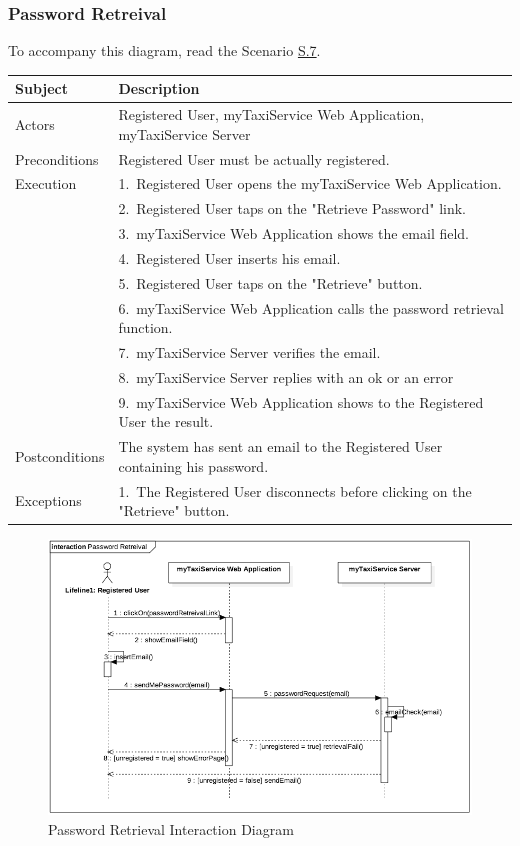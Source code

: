 \subsubsection{Password Retreival}
			To accompany this diagram, read the Scenario \hyperref[sec:PasswordRetrievalScenario]{S.7}.

				\begin{table}[htpb]
					\centering
					\label{tab:PasswordRetrievalDiagramTable}
					\begin{tabularx}{\textwidth}{lp{9cm}}
						\hline
						\hline
							\textbf{Subject}
						& 
							\textbf{Description}\\
						\hline
							Actors	       &  Registered User, myTaxiService Web Application, myTaxiService Server\\
						\hline
							Preconditions  &  Registered User must be actually registered.\\
						\hline
							Execution      &  1.~Registered User opens the myTaxiService Web Application.\\
										   &  2.~Registered User taps on the "Retrieve Password" link.\\
										   &  3.~myTaxiService Web Application shows the email field.\\
										   &  4.~Registered User inserts his email.\\
										   &  5.~Registered User taps on the "Retrieve" button.\\
										   &  6.~myTaxiService Web Application calls the password retrieval function.\\
										   &  7.~myTaxiService Server verifies the email.\\
										   &  8.~myTaxiService Server replies with an ok or an error\\
										   &  9.~myTaxiService Web Application shows to the Registered User the result.\\
						\hline
							Postconditions &  The system has sent an email to the Registered User containing his password.\\
						\hline
							Exceptions     &  1.~The Registered User disconnects before clicking on the "Retrieve" button.\\
									
						\hline
						\hline
					\end{tabularx}
				\end{table}
				
				\begin{figure}[H]
					\centering
					\includegraphics[width=\textwidth, scale=0.5]{IMG/InteractionDiagrams/PasswordRetrieval.png}
					\caption{Password Retrieval Interaction Diagram}\label{sec:FigureProfileModification}
				\end{figure}